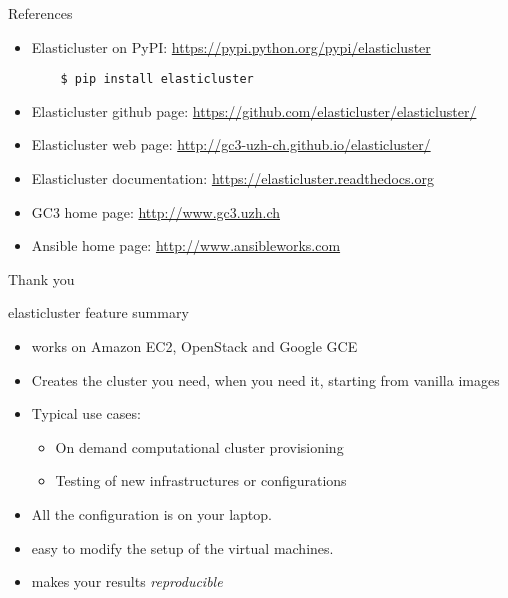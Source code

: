 \documentclass[english,serif,mathserif,usenames,dvipsnames]{beamer}
\begin{document}
\begin{frame}[fragile]
  {References}
  \begin{itemize}
  \item Elasticluster on PyPI:
    \url{https://pypi.python.org/pypi/elasticluster}

\begin{verbatim}
    $ pip install elasticluster
\end{verbatim}

  \item Elasticluster github page: 
    \url{https://github.com/elasticluster/elasticluster/}
  \item Elasticluster web page: 
    \url{http://gc3-uzh-ch.github.io/elasticluster/}
  \item Elasticluster documentation:
    \url{https://elasticluster.readthedocs.org}
  \item GC3 home page: \url{http://www.gc3.uzh.ch}
  \item Ansible home page: \url{http://www.ansibleworks.com}
  \end{itemize}
\end{frame}

\begin{frame}
  \begin{center}
    \Huge Thank you
  \end{center}
\end{frame}

\begin{frame}
  {elasticluster feature summary}
  \begin{itemize}
  \item works on Amazon EC2, OpenStack and Google GCE
  \item Creates the cluster you need, when you need it, starting from
    vanilla images
  \item Typical use cases:
    \begin{itemize}
    \item On demand computational cluster provisioning
    \item Testing of new infrastructures or configurations
    \end{itemize}
    
  \item All the configuration is on your laptop.
  \item easy to modify the setup of the virtual machines.
  \item makes your results \textit{reproducible}
  \end{itemize}
\end{frame}
\end{document}
